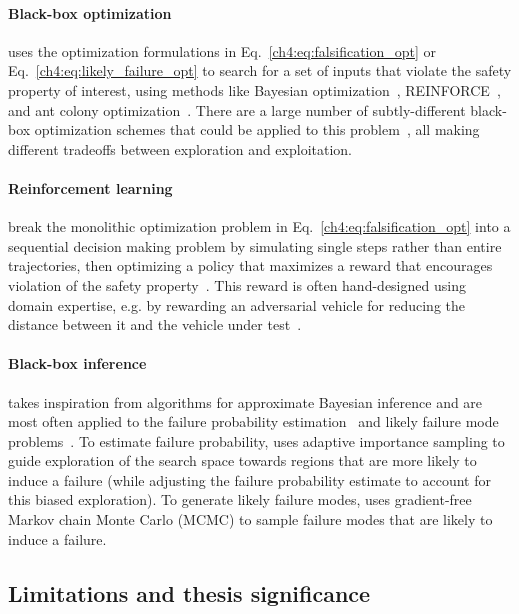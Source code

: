 \paragraph{Black-box optimization} uses the optimization formulations in Eq.~\eqref{ch4:eq:falsification_opt} or Eq.~\eqref{ch4:eq:likely_failure_opt} to search for a set of inputs that violate the safety property of interest, using methods like Bayesian optimization~\cite{wangAdvSimGeneratingSafetyCritical2021}, REINFORCE~\cite{dingLearningCollideAdaptive2020a}, and ant colony optimization~\cite{annpureddySTaLiRoToolTemporal2011}. There are a large number of subtly-different black-box optimization schemes that could be applied to this problem~\cite{kochenderfer_wheeler_2019}, all making different tradeoffs between exploration and exploitation.

\paragraph{Reinforcement learning} break the monolithic optimization problem in Eq.~\eqref{ch4:eq:falsification_opt} into a sequential decision making problem by simulating single steps rather than entire trajectories, then optimizing a policy that maximizes a reward that encourages violation of the safety property~\cite{corsoAdaptiveStressTesting2019}. This reward is often hand-designed using domain expertise, e.g. by rewarding an adversarial vehicle for reducing the distance between it and the vehicle under test~\cite{dingLearningCollideAdaptive2020a}.

\paragraph{Black-box inference} takes inspiration from algorithms for approximate Bayesian inference and are most often applied to the failure probability estimation~\cite{okellyScalableEndtoEndAutonomous2018} and likely failure mode problems~\cite{zhouRoCUSRobotController2021}. To estimate failure probability, \cite{okellyScalableEndtoEndAutonomous2018} uses adaptive importance sampling to guide exploration of the search space towards regions that are more likely to induce a failure (while adjusting the failure probability estimate to account for this biased exploration). To generate likely failure modes, \cite{zhouRoCUSRobotController2021} uses gradient-free Markov chain Monte Carlo (MCMC) to sample failure modes that are likely to induce a failure.

\subsection{Limitations and thesis significance}

